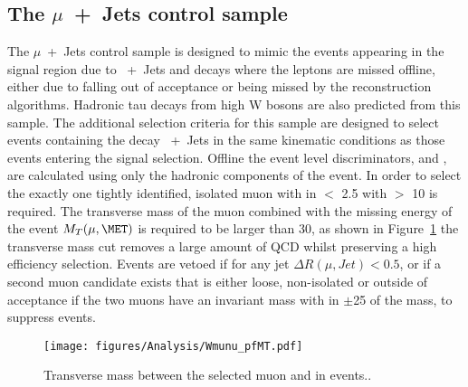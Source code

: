 \subsection{The $\mu$~+~Jets control sample} %
\label{par:the_mu_jets_control_sample}
The $\mu$~+~Jets control sample is designed to mimic the events appearing in 
the signal region due to \HepProcess{\PW}~+~Jets and \HepProcess{\Ptop\APtop} 
decays where the leptons are missed offline, either due to falling out of 
acceptance or being missed by the reconstruction algorithms. Hadronic tau 
decays from high \PT W bosons are also predicted from this sample.
The additional selection criteria for this sample are designed to select events 
containing the decay \HepProcess{\PW\to\mu\nu}~+~Jets in the same kinematic 
conditions as those events entering the signal selection. Offline the event 
level discriminators, \HT and \alt, are calculated using only the hadronic 
components of the event. In order to select the \HepProcess{\PW} exactly one 
tightly identified, isolated muon with in \mETA $<$ 2.5 with \PT $>$ 
\unit{10}{\GeV} is required. The transverse mass of the muon combined with the 
missing energy of the event $M_{T}(\mu,\MET)$ is required to be larger than 
\unit{30}{\GeV}, as shown in Figure~\ref{fig:figures_Analysis_Wmunu_pfMT} the 
transverse mass cut removes a large amount of QCD whilst preserving a high 
efficiency \HepProcess{\PW} selection. Events are vetoed if for any jet $\Delta 
R(\mu,Jet) < 0.5$, or if a second muon candidate exists that is either loose, 
non-isolated or outside of acceptance if the two muons have an invariant mass 
with in $\pm$\unit{25}{\GeV} of the \PZ mass, to suppress 
\HepProcess{\PZ\to\mu\mu} events.


\begin{figure}[htbp]
  \centering
    \texttt{[image: figures/Analysis/Wmunu\_pfMT.pdf]}
  \caption{Transverse mass between the selected muon and \MET in 
           \HepProcess{\PW\to\mu\nu} events.\cite{CMS-AN-10-264}.}
  \label{fig:figures_Analysis_Wmunu_pfMT}
\end{figure}


